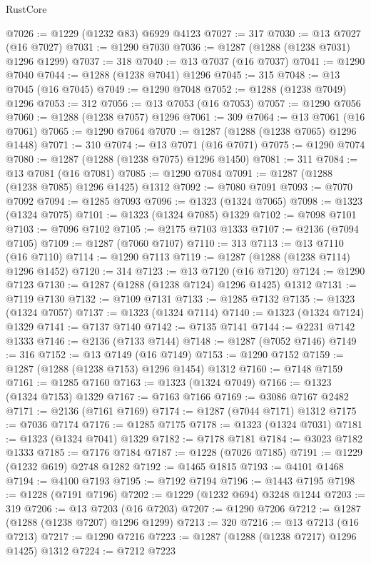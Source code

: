 \begin{lexlean}{RustCore}
\begin{coremodule}
@7026 := @1229 (@1232 @83) @6929 @4123
@7027 := 317
@7030 := @13 @7027 (@16 @7027)
@7031 := @1290 @7030
@7036 := @1287 (@1288 (@1238 @7031) @1296 @1299)
@7037 := 318
@7040 := @13 @7037 (@16 @7037)
@7041 := @1290 @7040
@7044 := @1288 (@1238 @7041) @1296
@7045 := 315
@7048 := @13 @7045 (@16 @7045)
@7049 := @1290 @7048
@7052 := @1288 (@1238 @7049) @1296
@7053 := 312
@7056 := @13 @7053 (@16 @7053)
@7057 := @1290 @7056
@7060 := @1288 (@1238 @7057) @1296
@7061 := 309
@7064 := @13 @7061 (@16 @7061)
@7065 := @1290 @7064
@7070 := @1287 (@1288 (@1238 @7065) @1296 @1448)
@7071 := 310
@7074 := @13 @7071 (@16 @7071)
@7075 := @1290 @7074
@7080 := @1287 (@1288 (@1238 @7075) @1296 @1450)
@7081 := 311
@7084 := @13 @7081 (@16 @7081)
@7085 := @1290 @7084
@7091 := @1287 (@1288 (@1238 @7085) @1296 @1425) @1312
@7092 := @7080 @7091
@7093 := @7070 @7092
@7094 := @1285 @7093
@7096 := @1323 (@1324 @7065)
@7098 := @1323 (@1324 @7075)
@7101 := @1323 (@1324 @7085) @1329
@7102 := @7098 @7101
@7103 := @7096 @7102
@7105 := @2175 @7103 @1333
@7107 := @2136 (@7094 @7105)
@7109 := @1287 (@7060 @7107)
@7110 := 313
@7113 := @13 @7110 (@16 @7110)
@7114 := @1290 @7113
@7119 := @1287 (@1288 (@1238 @7114) @1296 @1452)
@7120 := 314
@7123 := @13 @7120 (@16 @7120)
@7124 := @1290 @7123
@7130 := @1287 (@1288 (@1238 @7124) @1296 @1425) @1312
@7131 := @7119 @7130
@7132 := @7109 @7131
@7133 := @1285 @7132
@7135 := @1323 (@1324 @7057)
@7137 := @1323 (@1324 @7114)
@7140 := @1323 (@1324 @7124) @1329
@7141 := @7137 @7140
@7142 := @7135 @7141
@7144 := @2231 @7142 @1333
@7146 := @2136 (@7133 @7144)
@7148 := @1287 (@7052 @7146)
@7149 := 316
@7152 := @13 @7149 (@16 @7149)
@7153 := @1290 @7152
@7159 := @1287 (@1288 (@1238 @7153) @1296 @1454) @1312
@7160 := @7148 @7159
@7161 := @1285 @7160
@7163 := @1323 (@1324 @7049)
@7166 := @1323 (@1324 @7153) @1329
@7167 := @7163 @7166
@7169 := @3086 @7167 @2482
@7171 := @2136 (@7161 @7169)
@7174 := @1287 (@7044 @7171) @1312
@7175 := @7036 @7174
@7176 := @1285 @7175
@7178 := @1323 (@1324 @7031)
@7181 := @1323 (@1324 @7041) @1329
@7182 := @7178 @7181
@7184 := @3023 @7182 @1333
@7185 := @7176 @7184
@7187 := @1228 (@7026 @7185)
@7191 := @1229 (@1232 @619) @2748 @1282
@7192 := @1465 @1815
@7193 := @4101 @1468
@7194 := @4100 @7193
@7195 := @7192 @7194
@7196 := @1443 @7195
@7198 := @1228 (@7191 @7196)
@7202 := @1229 (@1232 @694) @3248 @1244
@7203 := 319
@7206 := @13 @7203 (@16 @7203)
@7207 := @1290 @7206
@7212 := @1287 (@1288 (@1238 @7207) @1296 @1299)
@7213 := 320
@7216 := @13 @7213 (@16 @7213)
@7217 := @1290 @7216
@7223 := @1287 (@1288 (@1238 @7217) @1296 @1425) @1312
@7224 := @7212 @7223

\end{coremodule}
\end{lexlean}
